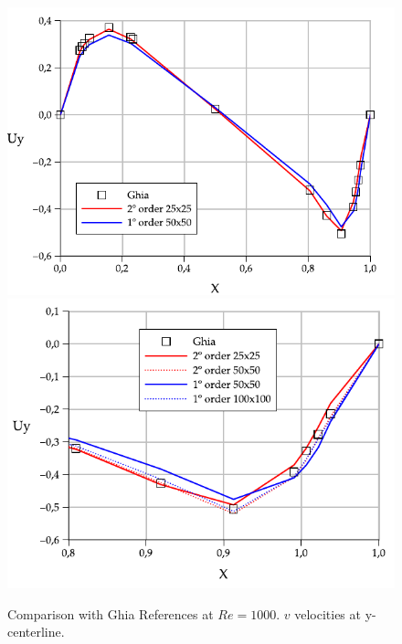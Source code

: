\documentclass[a4paper,conference]{IEEEtran}
\begin{document}
\begin{figure}[htbp]
  \begin{center}
      \includegraphics[width=.85\linewidth]{images/Re_1000_Uy.pdf}
      \includegraphics[width=.85\linewidth]{images/Re_1000_Uy_zoom.pdf}
  \end{center}
  \caption{\label{fg:Re1000v} Comparison with Ghia References at $Re=1000$. $v$ velocities at y-centerline.}
\end{figure}
\end{document}
